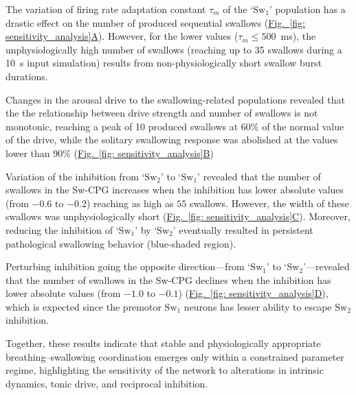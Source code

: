 \documentclass[pdflatex,sn-mathphys-ay]{sn-jnl}%
\renewcommand{\figureautorefname}{Fig.}
\newcommand{\Figref}[2][]{\hyperref[#2]{\figureautorefname~\ref*{#2}#1}}
\theoremstyle{thmstyleone}%
\theoremstyle{thmstyletwo}%
\theoremstyle{thmstylethree}%
\begin{document}
The variation of firing rate adaptation constant $\tau_m$ of the `$\text{Sw}_1$' population has a drastic effect on the number of produced sequential swallows (\Figref[A]{fig: sensitivity_analysis}). However, for the lower values ($\tau_m \leq 500$~ms), the unphysiologically high number of swallows (reaching up to 35 swallows during a 10~s input simulation) results from non-physiologically short swallow burst durations. 

Changes in the arousal drive to the swallowing-related populations revealed that the the relationship between drive strength and number of swallows is not monotonic, reaching a peak of 10 produced swallows at 60\% of the normal value of the drive, while the solitary swallowing response was abolished at the values lower than 90\% (\Figref[B]{fig: sensitivity_analysis})

Variation of the inhibition from `$\text{Sw}_2$' to `$\text{Sw}_1$' revealed that the number of swallows in the Sw-CPG increases when the inhibition has lower absolute values (from $-0.6$ to $-0.2$) reaching as high as $55$ swallows. However, the width of these swallows was unphysiologically short (\Figref[C]{fig: sensitivity_analysis}). Moreover, reducing the inhibition of `$\text{Sw}_1$' by `$\text{Sw}_2$' eventually resulted in persistent pathological swallowing behavior (blue-shaded region).

Perturbing inhibition going the opposite direction---from `$\text{Sw}_1$' to `$\text{Sw}_2$'---revealed that the number of swallows in the Sw-CPG declines when the inhibition has lower absolute values (from $-1.0$ to $-0.1$) (\Figref[D]{fig: sensitivity_analysis}), which is expected since the premotor $\text{Sw}_1$ neurons has lesser ability to escape $\text{Sw}_2$ inhibition.

Together, these results indicate that stable and physiologically appropriate breathing–swallowing coordination emerges only within a constrained parameter regime, highlighting the sensitivity of the network to alterations in intrinsic dynamics, tonic drive, and reciprocal inhibition.
\end{document}

